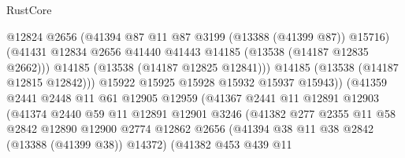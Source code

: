 \begin{lexlean}{RustCore}
\begin{coremodule}
                                        @12824
                                        @2656
                                        (@41394 @87 @11 @87 @3199 (@13388 (@41399 @87)) @15716)
                                        (@41431
                                          @12834
                                          @2656
                                          @41440
                                          @41443
                                          @14185
                                          (@13538 (@14187 @12835 @2662)))
                                        @14185
                                        (@13538 (@14187 @12825 @12841)))
                                      @14185
                                      (@13538 (@14187 @12815 @12842)))
                                    @15922
                                    @15925
                                    @15928
                                    @15932
                                    @15937
                                    @15943))
                                (@41359
                                  @2441
                                  @2448
                                  @11
                                  @61
                                  @12905
                                  @12959
                                  (@41367
                                    @2441
                                    @11
                                    @12891
                                    @12903
                                    (@41374
                                      @2440
                                      @59
                                      @11
                                      @12891
                                      @12901
                                      @3246
                                      (@41382
                                        @277
                                        @2355
                                        @11
                                        @58
                                        @2842
                                        @12890
                                        @12900
                                        @2774
                                        @12862
                                        @2656
                                        (@41394 @38 @11 @38 @2842 (@13388 (@41399 @38)) @14372)
                                        (@41382
                                          @453
                                          @439
                                          @11

\end{coremodule}
\end{lexlean}

